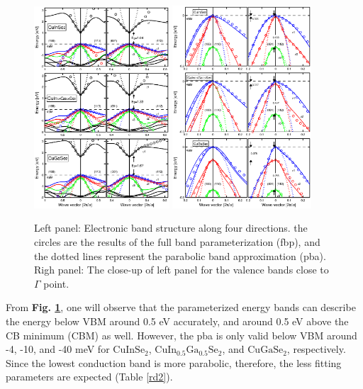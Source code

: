 \documentclass[a4paper, 12pt, titlepage,oneside,drop]{kthesis}
\begin{document}
\begin{figure}[H]
    \begin{center}
            \includegraphics[width=0.45\textwidth,clip]{paper2figure1}
            \includegraphics[width=0.46\textwidth,clip]{paper2figure2}
     \end{center}
    \caption{ Left panel: Electronic band structure along four directions.
 the circles are the results of the full band parameterization (fbp), 
and the dotted lines represent the parabolic band approximation (pba). 
Righ panel: The close-up of left panel for the valence bands close to $\Gamma$ point.}      
    \label{bandstruct}
\end{figure}

From \textbf{Fig. \ref{bandstruct}}, one will observe that the parameterized energy bands can describe the energy below VBM around 0.5 eV accurately, and around 0.5 eV above the CB minimum (CBM) as well.
However, the pba is only valid below VBM around -4, -10, and -40 meV for $\mathrm{CuInSe_2}$, $\mathrm{CuIn_{0.5}Ga_{0.5}Se_2}$, and $\mathrm{CuGaSe_2}$,
respectively. Since the lowest conduction band is more parabolic, therefore, the less fitting parameters are expected (Table \ref{rd2}).
\end{document}
